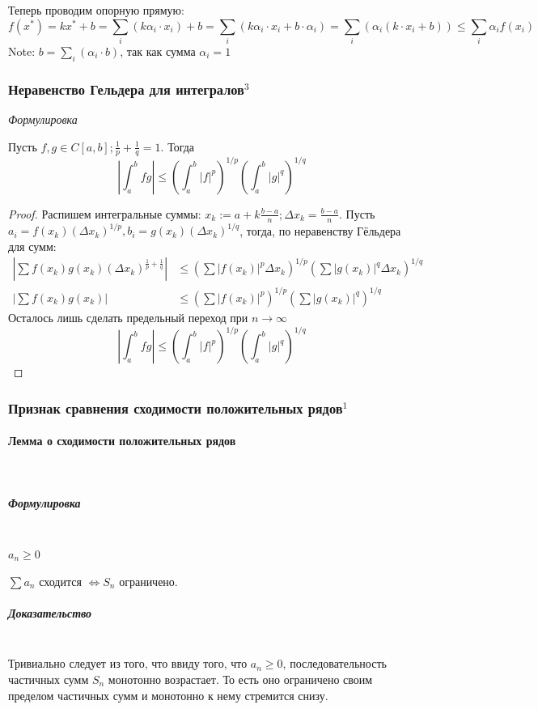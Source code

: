 \documentclass{article}
\let\vanillaparagraph\paragraph
\let\vanillasubparagraph\subparagraph
\renewcommand{\paragraph}[1]{\vanillaparagraph{#1}\mbox{}\\}
\renewcommand{\subparagraph}[1]{\vanillasubparagraph{#1}\mbox{}\\}
\begin{document}
Теперь проводим опорную прямую:
$$
f(x^*) = kx^* + b = \sum_i(k \alpha_i \cdot x_i) + b = \sum_i(k \alpha_i \cdot x_i + b\cdot\alpha_i) = \sum_i(\alpha_i (k \cdot x_i + b)) \le \sum_i\alpha_i f(x_i) 
$$
Note: $b = \sum_i(\alpha_i \cdot b)$, так как сумма $\alpha_i = 1$


\subsubsection{Неравенство Гельдера для интегралов\texorpdfstring{$^3$}{}}
\textit{Формулировка}

Пусть $f, g \in C[a, b]; \frac{1} {p} + \frac{1} {q} = 1$. Тогда
\begin{equation*}
\left|\int_a^b fg\right| \leq \left(\int_a^b |f|^p\right)^{1/p} \left(\int_a^b |g|^q\right)^{1/q}
\end{equation*}
\begin{proof}
Распишем интегральные суммы: $x_k := a + k\frac{b - a} {n}; \Delta x_k = \frac{b - a} {n}$. Пусть $a_i = f(x_k) (\Delta x_k)^{1/p}, b_i = g(x_k) (\Delta x_k)^{1/q}$, тогда, по неравенству Гёльдера для сумм:
\begin{align*}
\left|\sum f(x_k) g(x_k) (\Delta x_k)^{\frac{1} {p} + \frac{1} {q}} \right| &\leq \left(\sum|f(x_k)|^p \Delta x_k\right)^{1/p} \left(\sum|g(x_k)|^q \Delta x_k\right)^{1/q}\\
\left|\sum f(x_k) g(x_k)  \right| &\leq \left(\sum|f(x_k)|^p \right)^{1/p} \left(\sum|g(x_k)|^q \right)^{1/q}
\end{align*} 
Осталось лишь сделать предельный переход при $n \to \infty$
\begin{equation*}
\left|\int_a^b fg\right| \leq \left(\int_a^b |f|^p\right)^{1/p} \left(\int_a^b |g|^q\right)^{1/q}
\end{equation*}
\end{proof}

\subsubsection{Признак сравнения сходимости положительных рядов\texorpdfstring{$^1$}{}}
\paragraph{Лемма о сходимости положительных рядов}
\subparagraph{Формулировка}
$a_n \ge 0$

$\sum a_n$ сходится $\Leftrightarrow S_n$ ограничено.
\subparagraph{Доказательство}
Тривиально следует из того, что ввиду того, что $a_n \ge 0$, последовательность частичных сумм $S_n$ монотонно возрастает. То есть оно ограничено своим пределом частичных сумм и монотонно к нему стремится снизу.
\end{document}
